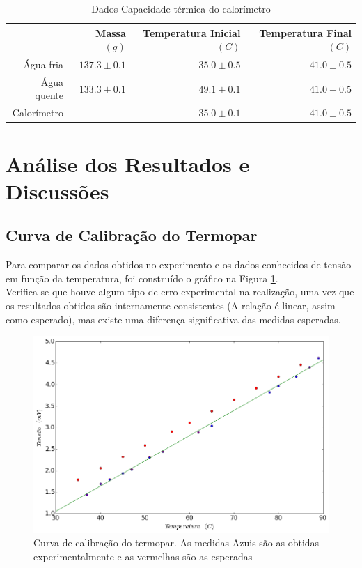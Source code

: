 \documentclass[12pt,a4paper]{article}
\begin{document}
\begin{table}[!htbp]

\centering
\def\arraystretch{1.5}
\caption{Dados Capacidade térmica do calorímetro}

\begin{tabular}{|r|r|r|r|}
\hline
&Massa $(g)$ & Temperatura Inicial $(C)$ & Temperatura Final $(C)$  \\
\hline
  Água fria & $137.3 \pm 0.1 $ & $35.0 \pm 0.5$ & $41.0 \pm 0.5$  \\    
  Água quente & $133.3 \pm 0.1$ & $49.1 \pm 0.1$ & $41.0 \pm 0.5$ \\
  Calorímetro &  & $35.0 \pm 0.1$ & $41.0 \pm 0.5$ \\
 
\hline
\end{tabular}


\label{dadoscalorimetro}
\end{table}


\section{Análise dos Resultados e Discussões}

\subsection{Curva de Calibração do Termopar}
Para comparar os dados obtidos no experimento e os dados conhecidos de tensão em função da temperatura, foi construído o gráfico na Figura \ref{termopar}.  \\
Verifica-se que houve algum tipo de erro experimental na realização, uma vez que os resultados obtidos são internamente consistentes (A relação é linear, assim como esperado), mas existe uma diferença significativa das medidas esperadas.

 
\begin{figure}[!htbp]
\includegraphics[scale=0.55]{termopar.png}
\caption{Curva de calibração do termopar. As medidas Azuis são as obtidas experimentalmente e as vermelhas são as esperadas}
\label{termopar}
\end{figure}
\end{document}
